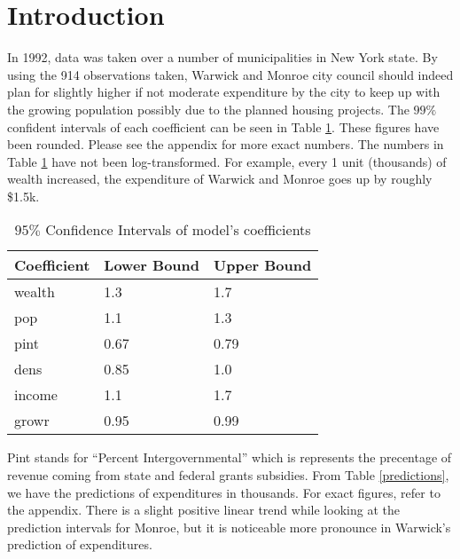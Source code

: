 \documentclass{article}
\begin{document}
\section{Introduction}
\qquad In 1992, data was taken over a number of municipalities in New York state. By using the 914 observations taken, Warwick and Monroe city council should indeed plan for slightly higher if not moderate expenditure by the city to keep up with the growing population possibly due to the planned housing projects. The $99\%$ confident intervals of each coefficient can be seen in Table \ref{coefficients}. These figures have been rounded. Please see the appendix for more exact numbers. The numbers in Table \ref{coefficients} have not been log-transformed. For example, every 1 unit (thousands) of wealth increased, the expenditure of Warwick and Monroe goes up by roughly \$1.5k. 
\begin{table}[h!]
  \begin{center}
    \caption{$95 \%$ Confidence Intervals of model's coefficients}
    \label{coefficients}
    \begin{tabular}{l|l|l} 
      \textbf{Coefficient} & \textbf{Lower Bound} & \textbf{Upper Bound}\\
      \hline
      wealth   &  1.3 & 1.7 \\
      pop       &  1.1 & 1.3 \\
      pint       &  0.67 & 0.79 \\
      dens      &  0.85 & 1.0\\
      income  &   1.1 & 1.7 \\
      growr    & 0.95 & 0.99 \\
      
    \end{tabular}
  \end{center}
\end{table}
Pint stands for ``Percent Intergovernmental'' which is represents the precentage of revenue coming from state and federal grants subsidies. From Table \ref {predictions}, we have the predictions of expenditures in thousands. For exact figures, refer to the appendix. There is a slight positive linear trend while looking at the prediction intervals for Monroe, but it is noticeable more pronounce in Warwick's prediction of expenditures. 
\end{document}
